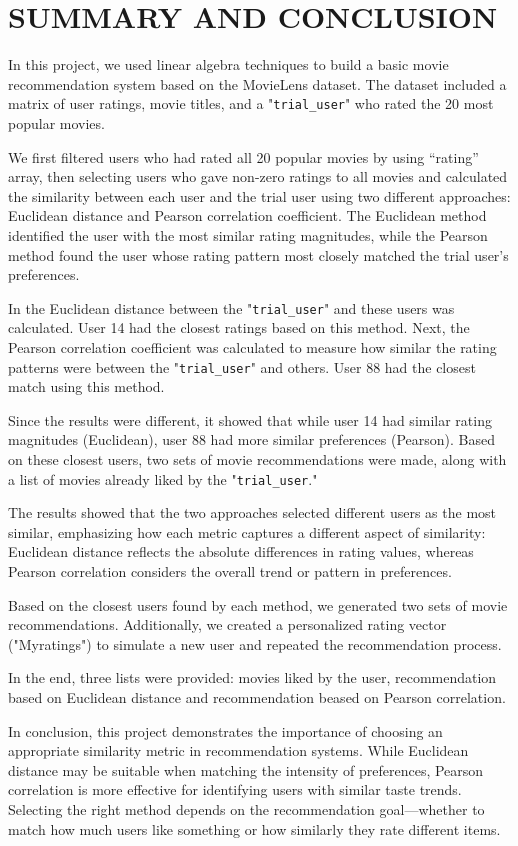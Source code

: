 \fontsize{13}{14}\selectfont
\section{SUMMARY AND CONCLUSION}

In this project, we used linear algebra techniques to build a basic movie recommendation system based on the MovieLens dataset. The dataset included a matrix of user ratings, movie titles, and a "\texttt{trial\_user}" who rated the 20 most popular movies.

We first filtered users who had rated all 20 popular movies by using “rating” array, then selecting users who gave non-zero ratings to all movies and calculated the similarity between each user and the trial user using two different approaches: Euclidean distance and Pearson correlation coefficient. The Euclidean method identified the user with the most similar rating magnitudes, while the Pearson method found the user whose rating pattern most closely matched the trial user's preferences.

In the Euclidean distance between the "\texttt{trial\_user}" and these users was calculated. User 14 had the closest ratings based on this method. Next, the Pearson correlation coefficient was calculated to measure how similar the rating patterns were between the "\texttt{trial\_user}" and others. User 88 had the closest match using this method.

Since the results were different, it showed that while user 14 had similar rating magnitudes (Euclidean), user 88 had more similar preferences (Pearson). Based on these closest users, two sets of movie recommendations were made, along with a list of movies already liked by the "\texttt{trial\_user}."

The results showed that the two approaches selected different users as the most similar, emphasizing how each metric captures a different aspect of similarity: Euclidean distance reflects the absolute differences in rating values, whereas Pearson correlation considers the overall trend or pattern in preferences.

Based on the closest users found by each method, we generated two sets of movie recommendations. Additionally, we created a personalized rating vector ("Myratings") to simulate a new user and repeated the recommendation process.

In the end, three lists were provided: movies liked by the user, recommendation based on Euclidean distance and recommendation beased on Pearson correlation.

In conclusion, this project demonstrates the importance of choosing an appropriate similarity metric in recommendation systems. While Euclidean distance may be suitable when matching the intensity of preferences, Pearson correlation is more effective for identifying users with similar taste trends. Selecting the right method depends on the recommendation goal—whether to match how much users like something or how similarly they rate different items.